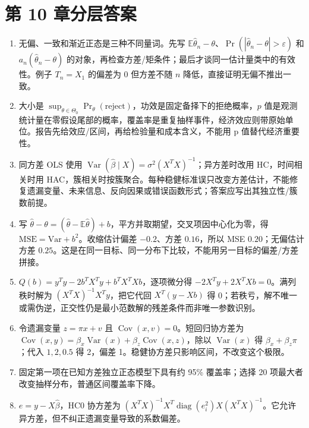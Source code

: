 \chapter{第 10 章分层答案}
\label{app:ch10-solutions}


\begin{enumerate}[leftmargin=*]
  \item 无偏、一致和渐近正态是三种不同量词。先写 $\mathbb E\hat\theta_n-\theta$、$\Pr(|\hat\theta_n-\theta|>\varepsilon)$ 和 $a_n(\hat\theta_n-\theta)$ 的对象，再检查方差/矩条件；最后才谈同一估计量类中的有效性。例子 $T_n=X_1$ 的偏差为 0 但方差不随 $n$ 降低，直接证明无偏不推出一致。
  \item 大小是 $\sup_{\theta\in\Theta_0}\Pr_\theta(\text{reject})$，功效是固定备择下的拒绝概率，$p$ 值是观测统计量在零假设尾部的概率，覆盖率是重复抽样事件，经济效应则带原始单位。报告先给效应/区间，再给检验量和成本含义，不能用 p 值替代经济重要性。
  \item 同方差 OLS 使用 $\operatorname{Var}(\hat\beta\mid X)=\sigma^2(X^TX)^{-1}$；异方差时改用 HC，时间相关时用 HAC，簇相关时按簇聚合。每种稳健标准误只改变方差估计，不能修复遗漏变量、未来信息、反向因果或错误函数形式；答案应写出其独立性/簇数前提。
  \item 写 $\hat\theta-\theta=(\hat\theta-\mathbb E\hat\theta)+b$，平方并取期望，交叉项因中心化为零，得 $\mathrm{MSE}=\mathrm{Var}+b^2$。收缩估计偏差 $-0.2$、方差 $0.16$，所以 MSE $0.20$；无偏估计方差 $0.25$。这是在同一目标、同一分布下比较，不能用另一目标的偏差/方差拼接。
  \item $Q(b)=y^Ty-2b^TX^Ty+b^TX^TXb$，逐项微分得 $-2X^Ty+2X^TXb=0$。满列秩时解为 $(X^TX)^{-1}X^Ty$，把它代回 $X^T(y-Xb)$ 得 0；若秩亏，解不唯一或需伪逆，正交性仍是最小范数解的残差条件而非唯一参数识别。
  \item 令遗漏变量 $z=\pi x+v$ 且 $\operatorname{Cov}(x,v)=0$。短回归协方差为 $\operatorname{Cov}(x,y)=\beta_x\operatorname{Var}(x)+\beta_z\operatorname{Cov}(x,z)$，除以 $\operatorname{Var}(x)$ 得 $\beta_x+\beta_z\pi$；代入 $1,2,0.5$ 得 2，偏差 1。稳健协方差只影响区间，不改变这个极限。

  \item 固定第一项在已知方差独立正态模型下具有约 95\% 覆盖率；选择 20 项最大者改变抽样分布，普通区间覆盖率下降。

  \item $e=y-X\hat\beta$，HC0 协方差为 $(X^TX)^{-1}X^T\operatorname{diag}(e_i^2)X(X^TX)^{-1}$。它允许异方差，但不纠正遗漏变量导致的系数偏差。


\end{enumerate}
